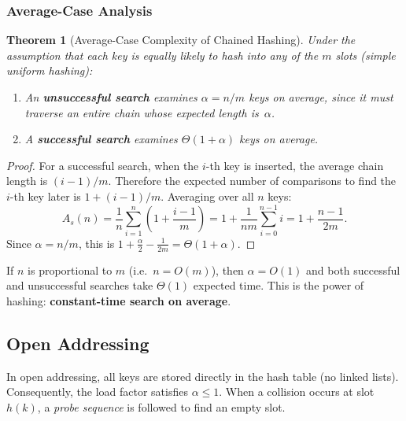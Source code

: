 \documentclass[11pt, a4paper, notitlepage]{report}
\newtheorem{theorem}{Theorem}[section]
\theoremstyle{definition}
\theoremstyle{remark}
\theoremstyle{definition}
\begin{document}
\subsubsection{Average-Case Analysis}
\label{subsubsec:chaining-avg}

\begin{theorem}[Average-Case Complexity of Chained Hashing]
\label{thm:chaining-avg}
Under the assumption that each key is equally likely to hash into any of the
$m$ slots (simple uniform hashing):
\begin{enumerate}
  \item An \textbf{unsuccessful search} examines $\alpha = n/m$ keys on
        average, since it must traverse an entire chain whose expected length
        is~$\alpha$.
  \item A \textbf{successful search} examines $\Theta(1 + \alpha)$ keys on
        average.
\end{enumerate}
\end{theorem}

\begin{proof}
For a successful search, when the $i$-th key is inserted, the average chain
length is $(i-1)/m$.  Therefore the expected number of comparisons to find the
$i$-th key later is $1 + (i-1)/m$.  Averaging over all $n$ keys:
\[
  A_s(n) = \frac{1}{n}\sum_{i=1}^{n}\left(1 + \frac{i-1}{m}\right)
         = 1 + \frac{1}{nm}\sum_{i=0}^{n-1} i
         = 1 + \frac{n-1}{2m}.
\]
Since $\alpha = n/m$, this is $1 + \frac{\alpha}{2} - \frac{1}{2m}
= \Theta(1 + \alpha)$.
\end{proof}

\begin{keyresult}[title={Key Result: Chained Hashing Performance}]
If $n$ is proportional to $m$ (i.e.\ $n = O(m)$), then $\alpha = O(1)$ and
both successful and unsuccessful searches take $\Theta(1)$ expected time.
This is the power of hashing: \textbf{constant-time search on average}.
\end{keyresult}

\subsection{Open Addressing}
\label{subsec:open-addressing}

In open addressing, all keys are stored directly in the hash table (no
linked lists).  Consequently, the load factor satisfies $\alpha \le 1$.  When
a collision occurs at slot $h(k)$, a \emph{probe sequence} is followed to
find an empty slot.
\end{document}
